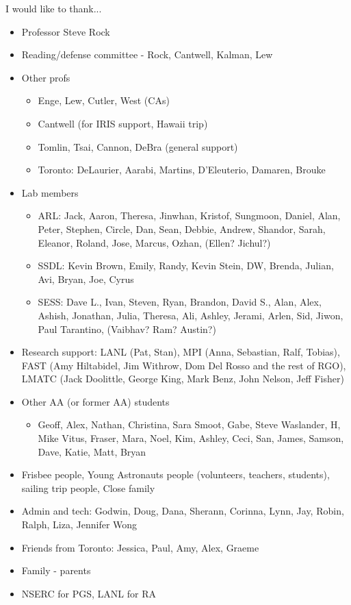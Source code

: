 
I would like to thank...

\begin{itemize}
\item Professor Steve Rock
\item Reading/defense committee - Rock, Cantwell, Kalman, Lew
\item Other profs
\begin{itemize}
\item Enge, Lew, Cutler, West (CAs)
\item Cantwell (for IRIS support, Hawaii trip)
\item Tomlin, Tsai, Cannon, DeBra (general support)
\item Toronto: DeLaurier, Aarabi, Martins, D'Eleuterio, Damaren, Brouke
\end{itemize}
\item Lab members
\begin{itemize}
\item ARL: Jack, Aaron, Theresa, Jinwhan, Kristof, Sungmoon, Daniel, Alan, Peter, Stephen, Circle, Dan, Sean, Debbie, Andrew, Shandor, Sarah, Eleanor, Roland, Jose, Marcus, Ozhan, (Ellen? Jichul?)
\end{itemize}
\begin{itemize}
\item SSDL: Kevin Brown, Emily, Randy, Kevin Stein, DW, Brenda, Julian, Avi, Bryan, Joe, Cyrus
\end{itemize}
\begin{itemize}
\item SESS: Dave L., Ivan, Steven, Ryan, Brandon, David S., Alan, Alex, Ashish, Jonathan, Julia, Theresa, Ali, Ashley, Jerami, Arlen, Sid, Jiwon, Paul Tarantino, (Vaibhav? Ram? Austin?)
\end{itemize}
\item Research support: LANL (Pat, Stan), MPI (Anna, Sebastian, Ralf, Tobias), FAST (Amy Hiltabidel, Jim Withrow, Dom Del Rosso
and the rest of RGO), LMATC (Jack Doolittle, George King, Mark Benz, John Nelson, Jeff Fisher)
\item Other AA (or former AA) students
\begin{itemize}
\item Geoff, Alex, Nathan, Christina, Sara Smoot, Gabe, Steve Waslander, H, Mike Vitus, Fraser, Mara, Noel, Kim, Ashley, Ceci, San, James, Samson, Dave, Katie, Matt, Bryan
\end{itemize}
\item Frisbee people, Young Astronauts people (volunteers, teachers, students), sailing trip people, Close family
\item Admin and tech: Godwin, Doug, Dana, Sherann, Corinna, Lynn, Jay, Robin, Ralph, Liza, Jennifer Wong
\item Friends from Toronto: Jessica, Paul, Amy, Alex, Graeme
\item Family - parents
\item NSERC for PGS, LANL for RA
\end{itemize}